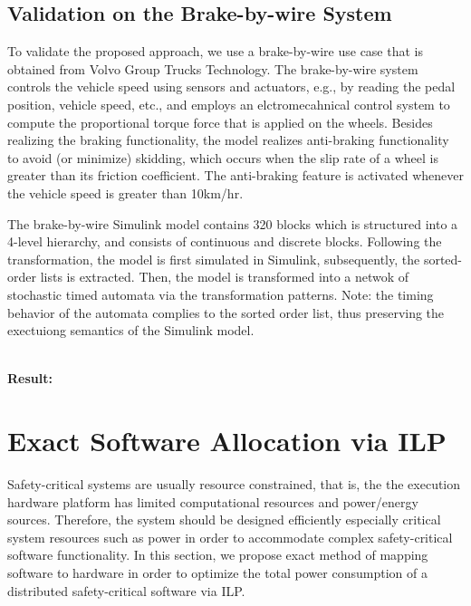 \subsection{Validation on the Brake-by-wire System} 
To validate the proposed approach, we use a brake-by-wire use case that is obtained from Volvo Group Trucks Technology. The brake-by-wire system controls the vehicle speed using sensors and actuators, e.g., by reading the pedal position, vehicle speed, etc., and employs an elctromecahnical control system to compute the proportional torque force that is applied on the wheels. Besides realizing the braking functionality, the model realizes anti-braking functionality to avoid (or minimize) skidding, which occurs when the slip rate of a wheel is greater than its friction coefficient.  The anti-braking feature is activated whenever the vehicle speed is greater than 10km/hr.

The brake-by-wire Simulink model contains 320 blocks which is structured into a 4-level hierarchy, and consists of continuous and discrete blocks. Following the transformation, the model is first simulated in Simulink, subsequently, the sorted-order lists is extracted. Then, the model is transformed into a netwok of stochastic timed automata via the transformation patterns. Note: the timing behavior of the automata complies to the sorted order list, thus preserving the exectuiong semantics of the Simulink model.

\noindent\\ \textbf{Result: } 

\section{Exact Software Allocation  via ILP}
Safety-critical systems are usually resource constrained, that is, the the execution hardware platform has limited computational resources and power/energy sources. Therefore, the system should be designed efficiently especially critical system resources such as power in order to accommodate complex safety-critical software functionality. In this section, we propose exact method of mapping software to hardware in order to optimize the total power consumption of a distributed safety-critical software via ILP.


